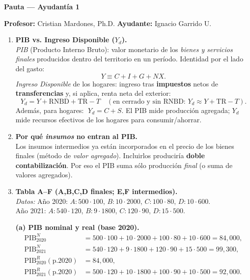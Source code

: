 \documentclass[11pt,addpoints]{article}
\begin{document}
\begin{center}
{\Large \bfseries Pauta — Ayudantía 1}\\[0.4cm]
\end{center}

\textbf{Profesor:} Cristian Mardones, Ph.D. \quad
\textbf{Ayudante:} Ignacio Garrido U.

\bigskip

\begin{enumerate}
\item \textbf{PIB vs. Ingreso Disponible ($Y_d$).}\\
\emph{PIB} (Producto Interno Bruto): valor monetario de los \emph{bienes y servicios finales} producidos dentro del territorio en un período. Identidad por el lado del gasto:
\[
Y \equiv C + I + G + NX.
\]
\emph{Ingreso Disponible} de los hogares: ingreso tras \textbf{impuestos} netos de \textbf{transferencias} y, si aplica, renta neta del exterior:
\[
Y_d = Y + \text{RNBD} + \text{TR} - T \quad (\text{en cerrado y sin RNBD: } Y_d \approx Y + \text{TR} - T).
\]
Además, para hogares: \(\; Y_d = C + S\). El PIB mide producción agregada; \(Y_d\) mide recursos efectivos de los hogares para consumir/ahorrar.

\item \textbf{Por qué \textit{insumos} no entran al PIB.}\\
Los insumos intermedios ya están incorporados en el precio de los bienes finales (método de \emph{valor agregado}). Incluirlos produciría \textbf{doble contabilización}. Por eso el PIB suma sólo producción \emph{final} (o suma de valores agregados).

\item \textbf{Tabla A–F (A,B,C,D finales; E,F intermedios).}\\
\emph{Datos:} 
Año 2020: \(A:500\cdot100\), \(B:10\cdot2000\), \(C:100\cdot80\), \(D:10\cdot600\).\\
Año 2021: \(A:540\cdot120\), \(B:9\cdot1800\), \(C:120\cdot90\), \(D:15\cdot500\).

\textbf{(a) PIB nominal y real (base 2020).}
\[
\begin{aligned}
\text{PIB}^{N}_{2020} &= 500\cdot100 + 10\cdot2000 + 100\cdot80 + 10\cdot600 = \boxed{84{,}000},\\
\text{PIB}^{N}_{2021} &= 540\cdot120 + 9\cdot1800 + 120\cdot90 + 15\cdot500 = \boxed{99{,}300},\\[4pt]
\text{PIB}^{R}_{2020}(\text{p.2020}) &= \boxed{84{,}000},\\
\text{PIB}^{R}_{2021}(\text{p.2020}) &= 500\cdot120 + 10\cdot1800 + 100\cdot90 + 10\cdot500 = \boxed{92{,}000}.
\end{aligned}
\]


\end{enumerate}
\end{document}
